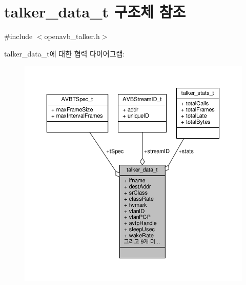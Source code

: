 \hypertarget{structtalker__data__t}{}\section{talker\+\_\+data\+\_\+t 구조체 참조}
\label{structtalker__data__t}


{\ttfamily \#include $<$openavb\+\_\+talker.\+h$>$}



talker\+\_\+data\+\_\+t에 대한 협력 다이어그램\+:
\nopagebreak
\begin{figure}[H]
\begin{center}
\leavevmode
\includegraphics[width=350pt]{structtalker__data__t__coll__graph}
\end{center}
\end{figure}
